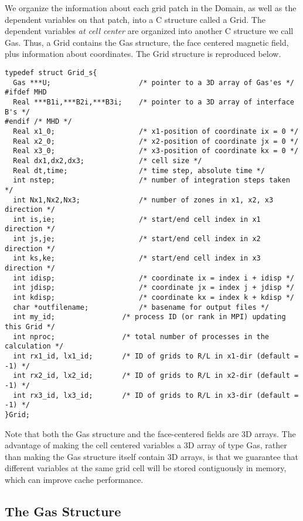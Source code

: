 We organize the information about each grid patch in the Domain,
as well as the dependent
variables on that patch, into a C structure called a Grid.  The dependent
variables {\em at cell center} are organized into another C structure we
call Gas.  Thus, a Grid contains the Gas structure, the face centered
magnetic field, plus information about coordinates.
The Grid structure is reproduced below.
\footnotesize
\begin{verbatim}
typedef struct Grid_s{
  Gas ***U;                     /* pointer to a 3D array of Gas'es */
#ifdef MHD
  Real ***B1i,***B2i,***B3i;    /* pointer to a 3D array of interface B's */
#endif /* MHD */
  Real x1_0;                    /* x1-position of coordinate ix = 0 */
  Real x2_0;                    /* x2-position of coordinate jx = 0 */
  Real x3_0;                    /* x3-position of coordinate kx = 0 */
  Real dx1,dx2,dx3;             /* cell size */
  Real dt,time;                 /* time step, absolute time */
  int nstep;                    /* number of integration steps taken */
  int Nx1,Nx2,Nx3;              /* number of zones in x1, x2, x3 direction */
  int is,ie;                    /* start/end cell index in x1 direction */
  int js,je;                    /* start/end cell index in x2 direction */
  int ks,ke;                    /* start/end cell index in x3 direction */
  int idisp;                    /* coordinate ix = index i + idisp */
  int jdisp;                    /* coordinate jx = index j + jdisp */
  int kdisp;                    /* coordinate kx = index k + kdisp */
  char *outfilename;            /* basename for output files */
  int my_id;                /* process ID (or rank in MPI) updating this Grid */
  int nproc;                /* total number of processes in the calculation */
  int rx1_id, lx1_id;       /* ID of grids to R/L in x1-dir (default = -1) */
  int rx2_id, lx2_id;       /* ID of grids to R/L in x2-dir (default = -1) */
  int rx3_id, lx3_id;       /* ID of grids to R/L in x3-dir (default = -1) */
}Grid;
\end{verbatim}
\normalsize
Note that both the Gas structure and the face-centered fields are
3D arrays.  The advantage of making the cell centered variables a 3D
array of type Gas, rather than making the Gas structure itself contain
3D arrays, is that we guarantee that different variables at the same
grid cell will be stored contiguously in memory, which can improve cache
performance.

\subsection{The Gas Structure}

